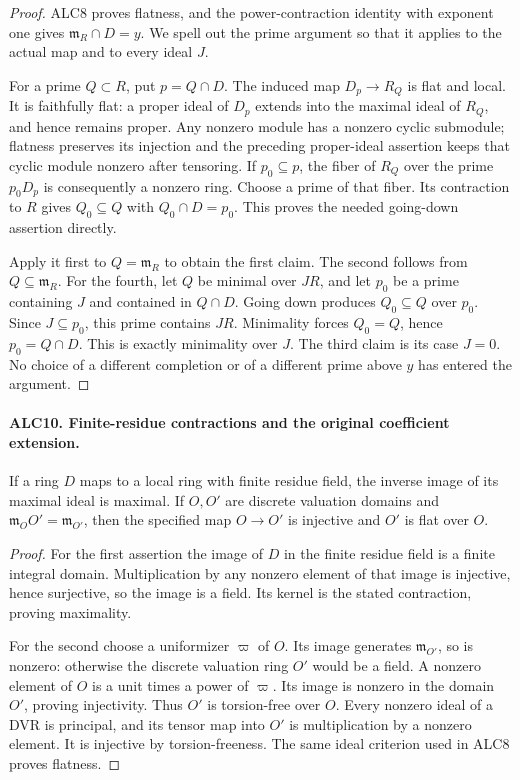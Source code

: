 \begin{proof}
ALC8 proves flatness, and the power-contraction identity with
exponent one gives \(\mathfrak m_R\cap D=y\).
We spell out the prime argument so that it applies to the
actual map and to every ideal \(J\).

For a prime \(Q\subset R\), put \(p=Q\cap D\).
The induced map \(D_p\to R_Q\) is flat and local.  It is
faithfully flat: a proper ideal of \(D_p\) extends into the
maximal ideal of \(R_Q\), and hence remains proper.  Any
nonzero module has a nonzero cyclic submodule; flatness
preserves its injection and the preceding proper-ideal
assertion keeps that cyclic module nonzero after tensoring.
If \(p_0\subseteq p\), the fiber of \(R_Q\) over the
prime \(p_0D_p\) is consequently a nonzero ring.  Choose
a prime of that fiber.  Its contraction to \(R\) gives
\(Q_0\subseteq Q\) with \(Q_0\cap D=p_0\).
This proves the needed going-down assertion directly.

Apply it first to \(Q=\mathfrak m_R\) to obtain the first
claim.  The second follows from \(Q\subseteq\mathfrak m_R\).
For the fourth, let \(Q\) be minimal over \(JR\), and
let \(p_0\) be a prime containing \(J\) and contained in
\(Q\cap D\).  Going down produces \(Q_0\subseteq Q\)
over \(p_0\).  Since \(J\subseteq p_0\), this prime
contains \(JR\).  Minimality forces \(Q_0=Q\), hence
\(p_0=Q\cap D\).  This is exactly minimality over \(J\).
The third claim is its case \(J=0\).  No choice of a
different completion or of a different prime above \(y\)
has entered the argument.
\end{proof}

\paragraph{ALC10. Finite-residue contractions and the original coefficient extension.}
\label{claim:ALC10}
If a ring \(D\) maps to a local ring with finite residue
field, the inverse image of its maximal ideal is maximal.
If \(O,O'\) are discrete valuation domains and
\(\mathfrak m_OO'=\mathfrak m_{O'}\), then the specified
map \(O\to O'\) is injective and \(O'\) is flat over \(O\).

\begin{proof}
For the first assertion the image of \(D\) in the finite
residue field is a finite integral domain.  Multiplication
by any nonzero element of that image is injective, hence
surjective, so the image is a field.  Its kernel is the
stated contraction, proving maximality.

For the second choose a uniformizer \(\varpi\) of \(O\).
Its image generates \(\mathfrak m_{O'}\), so is nonzero:
otherwise the discrete valuation ring \(O'\) would be a
field.  A nonzero element of \(O\) is a unit times a power
of \(\varpi\).  Its image is nonzero in the domain \(O'\),
proving injectivity.  Thus \(O'\) is torsion-free over \(O\).
Every nonzero ideal of a DVR is principal, and its tensor
map into \(O'\) is multiplication by a nonzero element.
It is injective by torsion-freeness.  The same ideal
criterion used in ALC8 proves flatness.
\end{proof}


